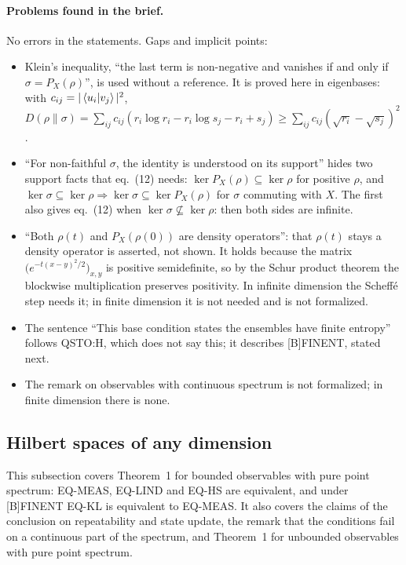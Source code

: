 \documentclass[11pt]{article}
\begin{document}
\paragraph{Problems found in the brief.} No errors in the statements. Gaps and implicit points:
\begin{itemize}
\item Klein's inequality, ``the last term is non-negative and vanishes if and only if
  $\sigma = P_X(\rho)$'', is used without a reference. It is proved here in eigenbases: with
  $c_{ij} = |\braket{u_i|v_j}|^2$,
  $D(\rho\|\sigma) = \sum_{ij} c_{ij}(r_i\log r_i - r_i\log s_j - r_i + s_j) \ge
  \sum_{ij} c_{ij}(\sqrt{r_i} - \sqrt{s_j})^2$.
\item ``For non-faithful $\sigma$, the identity is understood on its support'' hides two support
  facts that eq.~(12) needs: $\ker P_X(\rho) \subseteq \ker\rho$ for positive $\rho$, and
  $\ker\sigma \subseteq \ker\rho \Rightarrow \ker\sigma \subseteq \ker P_X(\rho)$ for $\sigma$
  commuting with $X$. The first also gives eq.~(12) when $\ker\sigma \not\subseteq \ker\rho$:
  then both sides are infinite.
\item ``Both $\rho(t)$ and $P_X(\rho(0))$ are density operators'': that $\rho(t)$ stays a density
  operator is asserted, not shown. It holds because the matrix
  $\bigl(e^{-t(x-y)^2/2}\bigr)_{x,y}$ is positive semidefinite, so by the Schur product theorem the
  blockwise multiplication preserves positivity. In infinite dimension the Scheff\'e step needs
  it; in finite dimension it is not needed and is not formalized.
\item The sentence ``This base condition states the ensembles have finite entropy'' follows
  QSTO:H, which does not say this; it describes [B]FINENT, stated next.
\item The remark on observables with continuous spectrum is not formalized; in finite dimension
  there is none.
\end{itemize}

\subsection{Hilbert spaces of any dimension}\label{sec:projective-measurement-any-dim}

This subsection covers Theorem~1 for bounded observables with pure point spectrum: EQ-MEAS,
EQ-LIND and EQ-HS are equivalent, and under [B]FINENT EQ-KL is equivalent to EQ-MEAS. It also
covers the claims of the conclusion on repeatability and state update, the remark that the
conditions fail on a continuous part of the spectrum, and Theorem~1 for unbounded observables with
pure point spectrum.
\end{document}
